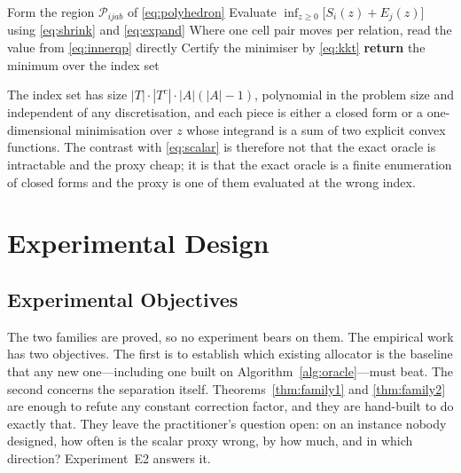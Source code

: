 \begin{algorithm}[htbp]
\caption{Exact certification energy}
\label{alg:oracle}
\begin{algorithmic}[1]
  \STATE Form the region $\mathcal{P}_{ijab}$ of \eqref{eq:polyhedron}
  \STATE Evaluate $\inf_{z\ge0}\bigl[S_{i}(z)+E_{j}(z)\bigr]$ using
         \eqref{eq:shrink} and \eqref{eq:expand}
  \STATE Where one cell pair moves per relation, read the value from
         \eqref{eq:innerqp} directly
  \STATE Certify the minimiser by \eqref{eq:kkt} 
\ENDFOR
\STATE \textbf{return} the minimum over the index set
\end{algorithmic}
\end{algorithm}

The index set has size $|T|\cdot|T^{c}|\cdot|A|(|A|-1)$, polynomial in the problem size and
independent of any discretisation, and each piece is either a closed form or a
one-dimensional minimisation over $z$ whose integrand is a sum of two explicit convex
functions. The contrast with \eqref{eq:scalar} is therefore not that the exact oracle is
intractable and the proxy cheap; it is that the exact oracle is a finite enumeration of
closed forms and the proxy is one of them evaluated at the wrong index.

\section{Experimental Design}
\label{sec:expdesign}

\subsection{Experimental Objectives}

The two families are proved, so no experiment bears on them. The empirical work has two
objectives. The first is to establish which existing allocator is the baseline that any new
one---including one built on Algorithm~\ref{alg:oracle}---must beat. The second concerns the
separation itself. Theorems~\ref{thm:family1} and \ref{thm:family2} are enough to refute any
constant correction factor, and they are hand-built to do exactly that. They leave the
practitioner's question open: on an instance nobody designed, how often is the scalar proxy
wrong, by how much, and in which direction? Experiment~E2 answers it.

